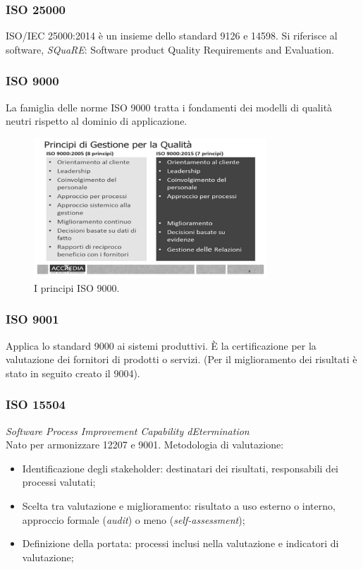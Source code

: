 			\subsubsection{ISO 25000}	\label{2500}
			ISO/IEC 25000:2014 è un insieme dello standard 9126 e 14598.
			Si riferisce al software, \textit{SQuaRE}: Software product Quality Requirements and Evaluation.
			
			\subsubsection{ISO 9000}	\label{9000}
			La famiglia delle norme ISO 9000 tratta i fondamenti dei modelli di qualità neutri rispetto al dominio di applicazione.
			
			\begin{figure}[H]
				\centering
				\includegraphics[width=0.78\textwidth]{img/9000}		
				\caption{I principi ISO 9000.}
			\end{figure} 
			
			\subsubsection{ISO 9001}	\label{9001}
			Applica lo standard 9000 ai sistemi produttivi. È la certificazione per la valutazione dei fornitori di prodotti o servizi. (Per il miglioramento dei risultati è stato in seguito creato il 9004).
			
			\subsubsection{ISO 15504}	\label{15504}
			\textit{Software Process Improvement Capability dEtermination} \\
			Nato per armonizzare 12207 e 9001. Metodologia di valutazione:
			\begin{itemize}
				\item Identificazione degli stakeholder: destinatari dei risultati, responsabili dei processi valutati;
				\item Scelta tra valutazione e miglioramento: risultato a uso esterno o interno, approccio formale (\textit{audit}) o meno (\textit{self-assessment}); 
				\item Definizione della portata: processi inclusi nella valutazione e indicatori di valutazione;
			\end{itemize}
					

